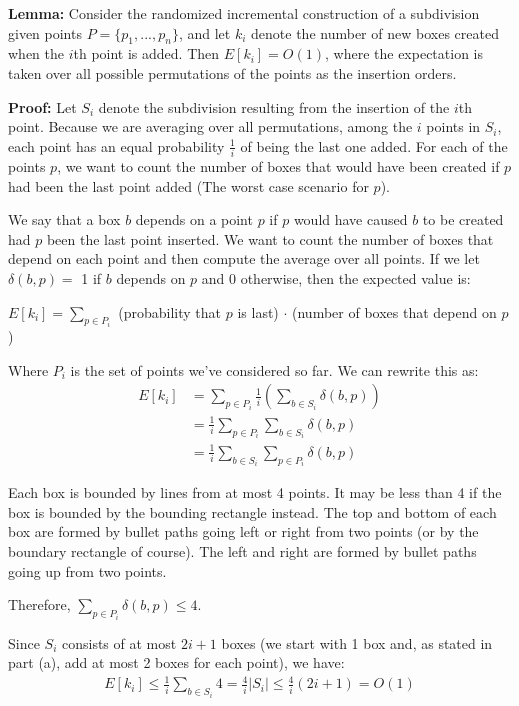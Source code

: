 \documentclass[11pt]{article}
\begin{document}
\begin{enumerate}[(a)]
\begin{solution}
  \textbf{Lemma:} Consider the randomized incremental construction of a subdivision given points \(P = \{p_1,...,p_n\}\), and let \(k_i\) denote the
  number of new boxes created when the \(i\)th point is added. Then \(E[k_i] = O(1)\), where the expectation is taken over all possible permutations of the
  points as the insertion orders.

  \textbf{Proof:} Let \(S_i\) denote the subdivision resulting from the insertion of the \(i\)th point. Because we are averaging over all permutations, among the \(i\) points
  in \(S_i\), each point has an equal probability \(\frac{1}{i}\) of being the last one added. For each of the points \(p\), we want to count the number of boxes
  that would have been created if \(p\) had been the last point added (The worst case scenario for \(p\)).

  We say that a box \(b\) depends on a point \(p\) if \(p\) would have caused \(b\) to be created had \(p\) been the last point inserted. We want to count the number of boxes
  that depend on each point and then compute the average over all points. If we let \(\delta(b,p)=\) 1 if \(b\) depends on \(p\) and 0 otherwise, then the expected value is:

  \(E[k_i] = \sum_{p \in P_i}\) (probability that \(p\) is last) \(\cdot\) (number of boxes that depend on \(p\))

  Where \(P_i\) is the set of points we've considered so far. We can rewrite this as:
  \begin{align*}
    E[k_i] &= \sum_{p \in P_i} \frac{1}{i} \left( \sum_{b \in S_i} \delta(b,p) \right) \\
    &= \frac{1}{i} \sum_{p \in P_i} \sum_{b \in S_i} \delta(b,p) \\
    &= \frac{1}{i} \sum_{b \in S_i} \sum_{p \in P_i} \delta(b,p)
  \end{align*}

  Each box is bounded by lines from at most 4 points. It may be less than 4 if the box is bounded by the bounding rectangle instead. The top and bottom of each box are formed by bullet paths going left
  or right from two points (or by the boundary rectangle of course). The left and right are formed by bullet paths going up from two points.
  
  Therefore, \(\sum_{p \in P_i} \delta(b,p) \leq 4\).

  Since \(S_i\) consists of at most \(2i + 1\) boxes (we start with 1 box and, as stated in part (a), add at most 2 boxes for each point), we have:
  \begin{align*}
    E[k_i] \leq \frac{1}{i} \sum_{b \in S_i} 4 = \frac{4}{i} |S_i| \leq \frac{4}{i}(2i + 1) = O(1)
  \end{align*}

\end{solution}

\end{enumerate}
\end{document}

